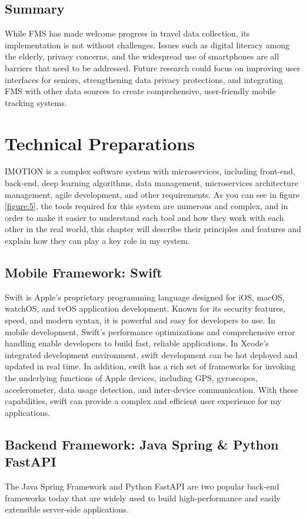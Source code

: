 \documentclass[12pt,two side]{report}
\begin{document}
\section{Summary}
While FMS has made welcome progress in travel data collection, its implementation is not without challenges. Issues such as digital literacy among the elderly, privacy concerns, and the widespread use of smartphones are all barriers that need to be addressed. Future research could focus on improving user interfaces for seniors, strengthening data privacy protections, and integrating FMS with other data sources to create comprehensive, user-friendly mobile tracking systems.


\chapter{Technical Preparations}
IMOTION is a complex software system with microservices, including front-end, back-end, deep learning algorithms, data management, microservices architecture management, agile development, and other requirements. As you can see in figure \ref{figure:5}, the tools required for this system are numerous and complex, and in order to make it easier to understand each tool and how they work with each other in the real world, this chapter will describe their principles and features and explain how they can play a key role in my system.
\section{Mobile Framework: Swift}

Swift is Apple's proprietary programming language designed for iOS, macOS, watchOS, and tvOS application development\cite{swift}. Known for its security features, speed, and modern syntax, it is powerful and easy for developers to use. In mobile development, Swift's performance optimizations and comprehensive error handling enable developers to build fast, reliable applications.\cite{swift} In Xcode's integrated development environment, swift development can be hot deployed and updated in real time\cite{swift}. In addition, swift has a rich set of frameworks for invoking the underlying functions of Apple devices, including GPS, gyroscopes, accelerometer, data usage detection, and inter-device communication\cite{swift}. With these capabilities, swift can provide a complex and efficient user experience for my applications.

\section{Backend Framework: Java Spring \& Python FastAPI}
The Java Spring Framework and Python FastAPI are two popular back-end frameworks today that are widely used to build high-performance and easily extensible server-side applications.\newline
\end{document}
